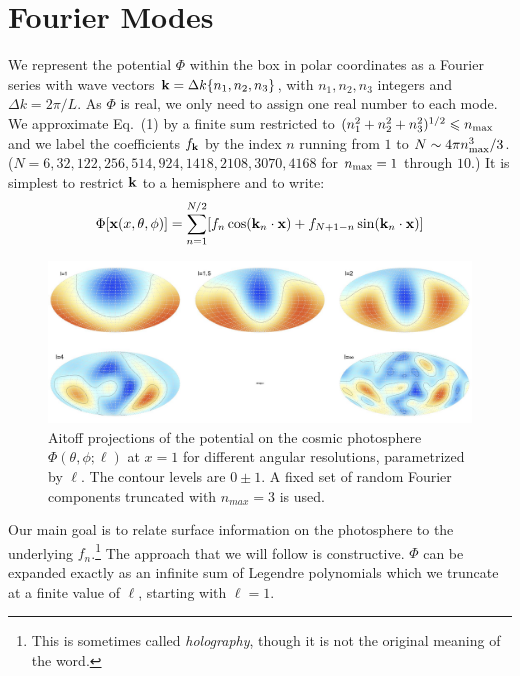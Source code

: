\documentclass[useAMS,usenatbib,a4paper]{mn2e}
\begin{document}

\section{Fourier Modes}
We represent the potential $\Phi$ within the box in polar coordinates
as a Fourier series with wave vectors ${\bf k}=\Delta
k\{n_1,n_2,n_3\}$, with $n_1,n_2,n_3$ integers and $\Delta k=2\pi/L$.
As $\Phi$ is real, we only need to assign one real number to each
mode. We approximate Eq.~(1) by a finite sum restricted to
$(n_1^2+n_2^2+n_3^2)^{1/2}\le n_{\rm max}$ and we label the
coefficients $f_{\bf k}$ by the index $n$ running from $1$ to
$N\sim4\pi n_{\rm max}^3/3$. ($N=6,32,122,
256,514,924,1418,2108,3070,4168$ for $n_{\rm max}=1$ through $10$.) It
is simplest to restrict ${\bf k}$ to a hemisphere and to write:
\begin{equation}
\Phi[{\bf x}(x,\theta,\phi)]=\sum_{n=1}^{N/2}[f_n\cos({\bf k}_n\cdot{\bf x})+f_{N+1-n}\sin({\bf k}_n\cdot{\bf x})]
\end{equation}

\begin{figure}
\centering
\includegraphics[width=0.9\linewidth]{fig1.jpg}
\caption{Aitoff projections of the potential on the cosmic photosphere $\Phi(\theta,\phi;\ell)$ at $x=1$ for different angular resolutions, parametrized by $\ell$. The contour levels are $0\pm1$. A fixed set of random Fourier components truncated with $n_{max}=3$ is used.}
\end{figure}

Our main goal is to relate surface information on the photosphere to
the underlying $f_n$.\footnote{This is sometimes called
\emph{holography}, though it is not the original meaning of the word.}
The approach that we will follow is constructive. $\Phi$ can be
expanded exactly as an infinite sum of Legendre polynomials which we
truncate at a finite value of $\ell$, starting with $\ell=1$.
\end{document}
